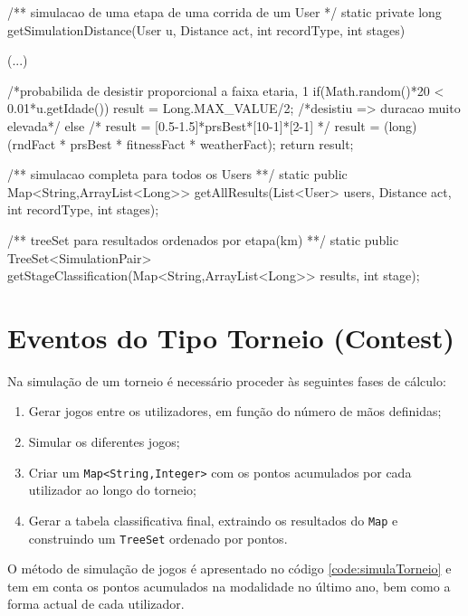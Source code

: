 \documentclass[a4paper,10pt]{report}
\begin{document}
\begin{code}[caption=Métodos para a simulação de corridas (src/core/EventSimulation.java)., label=code:simulaCorrida]
/** simulacao de uma etapa de uma corrida de um User */
static private long getSimulationDistance(User u, Distance act,
                                                int recordType, int stages) {
    (...)

    /*probabilida de desistir proporcional a faixa etaria, 1%
    if(Math.random()*20 < 0.01*u.getIdade())
	result = Long.MAX_VALUE/2; /*desistiu => duracao muito elevada*/
    else{
	/* result = [0.5-1.5]*prsBest*[10-1]*[2-1] */
	result = (long) (rndFact * prsBest * fitnessFact * weatherFact);
    }
    return result;
}

/** simulacao completa para todos os Users **/
static public Map<String,ArrayList<Long>> getAllResults(List<User> users, Distance act, 
                                                int recordType, int stages);

/** treeSet para resultados ordenados por etapa(km) **/
static public TreeSet<SimulationPair> getStageClassification(Map<String,ArrayList<Long>> results, int stage);
\end{code}

\section{Eventos do Tipo Torneio (Contest)}
\label{sec:simulaTorneio}
Na simulação de um torneio é necessário proceder às seguintes fases de cálculo:
\begin{enumerate}
 \item Gerar jogos entre os utilizadores, em função do número de mãos definidas;
 \item Simular os diferentes jogos;
 \item Criar um \verb!Map<String,Integer>! com os pontos acumulados por cada utilizador ao longo do torneio;
 \item Gerar a tabela classificativa final, extraindo os resultados do \verb!Map! e construindo um \verb!TreeSet! ordenado por pontos.
\end{enumerate}
O método de simulação de jogos é apresentado no código \ref{code:simulaTorneio} e tem em conta os pontos acumulados na modalidade no último ano, 
bem como a forma actual de cada utilizador.
\end{document}
